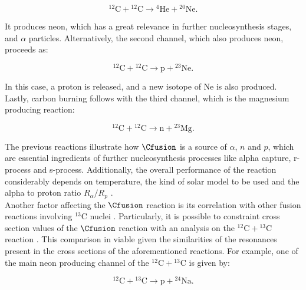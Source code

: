 \documentclass[openany]{book}
\begin{document}
\begin{equation} \label{eq:reaction_C12fusion_alpha20Ne}
	\mathrm{{}^{12}C + {}^{12}C \rightarrow {}^{4}He + {}^{20}Ne}. 
\end{equation}

It produces neon, which has a great relevance in further nucleosynthesis stages, and $\alpha$ particles. Alternatively, the second channel, which also produces neon, proceeds as:

\begin{equation} \label{eq:reaction_C12fusion_p23Ne}
	\mathrm{{}^{12}C + {}^{12}C \rightarrow p + {}^{23}Ne}. 
\end{equation}

In this case, a proton is released, and a new isotope of Ne is also produced. Lastly, carbon burning follows with the third channel, which is the magnesium producing reaction:

\begin{equation} \label{eq:reaction_C12fusion_n23Mg}
	\mathrm{{}^{12}C + {}^{12}C \rightarrow n  + {}^{23}Mg}. 
\end{equation}

The previous reactions illustrate how $\Cfusion$ is a source of $\alpha$, $n$ and $p$, which are essential ingredients of further nucleosynthesis processes like alpha capture, r-process and s-process. Additionally, the overall performance of the reaction considerably depends on temperature, the kind of solar model to be used and the alpha to proton ratio $R_\alpha/R_p$  \cite{pignatari_hirschi_wiescher_gallino_bennett_beard_fryer_herwig_rockefeller_timmes_et_2012}. \\

Another factor affecting the $\Cfusion$ reaction is its correlation with other fusion reactions involving $\mathrm{{}^{13}C}$ nuclei \cite{notani_esbensen_fang_bucher_davies_jiang_lamm_lin_ma_martin_et_2012}. Particularly, it is possible to constraint cross section values of the $\Cfusion$ reaction with an analysis on the $\mathrm{{}^{12}C + {}^{13}C}$ reaction \cite{zhang_wang_tudor_bucher_burducea_chen_chen_chesneanu_chilug_gasques_et_2020}. This comparison in viable given the similarities of the resonances present in the cross sections of the aforementioned reactions. For example, one of the main  neon producing channel of the $\mathrm{{}^{12}C + {}^{13}C}$ is given by: 

\begin{equation}\label{eq:middleFusion_12C13C}
	\mathrm{{}^{12}C + {}^{13}C \rightarrow p + {}^{24}Na}.
\end{equation} 
\end{document}
